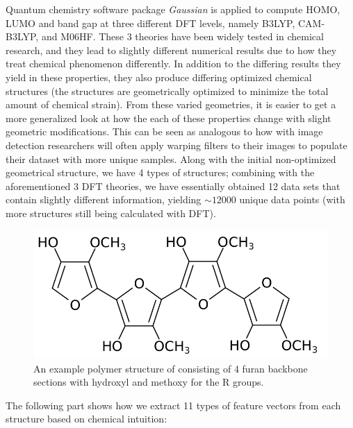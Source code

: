 \documentclass[10pt, oneside]{article}   	%
\begin{document}
Quantum chemistry software package \textit{Gaussian} \cite{gaussian} is applied to compute HOMO, LUMO and band gap at three different DFT levels, namely B3LYP, CAM-B3LYP, and M06HF. These 3 theories have been widely tested in chemical research, and they lead to slightly different numerical results due to how they treat chemical phenomenon differently. In addition to the differing results they yield in these properties, they also produce differing optimized chemical structures (the structures are geometrically optimized to minimize the total amount of chemical strain). From these varied geometries, it is easier to get a more generalized look at how the each of these properties change with slight geometric modifications. This can be seen as analogous to how with image detection researchers will often apply warping filters to their images to populate their dataset with more unique samples. Along with the initial non-optimized geometrical structure, we have 4 types of structures; combining with the aforementioned 3 DFT theories, we have essentially obtained 12 data sets that contain slightly different information, yielding $\sim12000$ unique data points (with more structures still being calculated with DFT).


\begin{figure}[H]
\begin{center}
\includegraphics [width=.3\textwidth]{furan.png}
\caption{An example polymer structure of consisting of 4 furan backbone sections with hydroxyl and methoxy for the R groups.}\label{furan}
\end{center}
\end{figure}


The following part shows how we extract 11 types of feature vectors from each structure based on chemical intuition:
\end{document}
